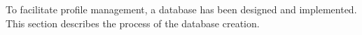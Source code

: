 To facilitate profile management, a database has been designed and implemented. This section describes the process of the database creation.